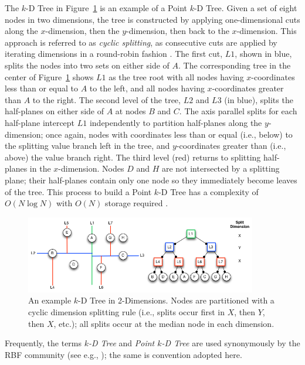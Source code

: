 \documentclass{report}
\begin{document}
The $k$-D Tree in Figure~\ref{fig:kdtree_example} is an example of a Point $k$-D Tree. Given a set of eight nodes in two dimensions, the tree is constructed by applying one-dimensional cuts along the $x$-dimension, then the $y$-dimension, then back to the $x$-dimension. This approach is referred to as \emph{cyclic splitting}, as consecutive cuts are applied by iterating dimensions in a round-robin fashion \cite{Samet2005}. The first cut, $L1$, shown in blue, splits the nodes into two sets on either side of $A$. The corresponding tree in the center of Figure~\ref{fig:kdtree_example} shows $L1$ as the tree root with all nodes having $x$-coordinates less than or equal to $A$ to the left, and all nodes having $x$-coordinates greater than $A$ to the right. The second level of the tree, $L2$ and $L3$ (in blue), splits the half-planes on either side of $A$ at nodes $B$ and $C$. The axis parallel splits for each half-plane intercept $L1$ independently to partition half-planes along the $y$-dimension; once again, nodes with coordinates less than or equal (i.e., below) to the splitting value branch left in the tree, and $y$-coordinates greater than  (i.e., above) the value branch right. The third level (red) returns to splitting half-planes in the $x$-dimension. Nodes $D$ and $H$ are not intersected by a splitting plane; their half-planes contain only one node so they immediately become leaves of the tree. This process to build a Point $k$-D Tree has a complexity of $O(N \log N)$ with $O(N)$ storage required \cite{Berg2008,Samet2005}.

\begin{figure}
\centering
\includegraphics[width=0.9\textwidth]{rbffd_methods_content/neighbors/kdTree_example.png}
\caption{An example $k$-D Tree in 2-Dimensions. Nodes are partitioned with a cyclic dimension splitting rule (i.e., splits occur first in $X$, then $Y$, then $X$, etc.); all splits occur at the median node in each dimension. }
\label{fig:kdtree_example}
\end{figure}

Frequently, the terms \emph{$k$-D Tree} and \emph{Point $k$-D Tree} are used synonymously by the RBF community (see e.g., \cite{Fasshauer2007,FlyerLehto11,FornbergLehto11}); the same is convention adopted here. 
\end{document}
